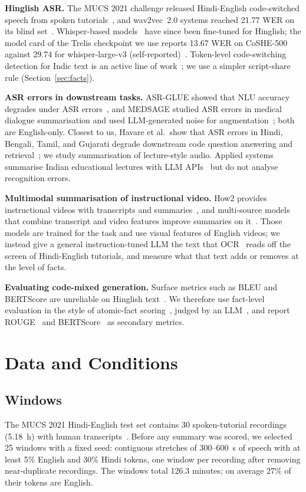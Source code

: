 \documentclass[conference]{IEEEtran}
\begin{document}
\textbf{Hinglish ASR.} The MUCS 2021 challenge released Hindi-English code-switched speech from spoken tutorials~\cite{diwan2021mucs}, and wav2vec~2.0 systems reached 21.77 WER on its blind set~\cite{chadha2022}. Whisper-based models~\cite{radford2023whisper} have since been fine-tuned for Hinglish; the model card of the Trelis checkpoint we use reports 13.67 WER on CoSHE-500 against 29.74 for whisper-large-v3 (self-reported)~\cite{trelis2025}. Token-level code-switching detection for Indic text is an active line of work~\cite{bhanushali2026csdi}; we use a simpler script-share rule (Section~\ref{sec:facts}).

\textbf{ASR errors in downstream tasks.} ASR-GLUE showed that NLU accuracy degrades under ASR errors~\cite{feng2021asrglue}, and MEDSAGE studied ASR errors in medical dialogue summarisation and used LLM-generated noise for augmentation~\cite{binici2025medsage}; both are English-only. Closest to us, Havare et al.\ show that ASR errors in Hindi, Bengali, Tamil, and Gujarati degrade downstream code question answering and retrieval~\cite{havare2026lost}; we study summarisation of lecture-style audio. Applied systems summarise Indian educational lectures with LLM APIs~\cite{kumar2026ccic} but do not analyse recognition errors.

\textbf{Multimodal summarisation of instructional video.} How2 provides instructional videos with transcripts and summaries~\cite{sanabria2018how2}, and multi-source models that combine transcript and video features improve summaries on it~\cite{palaskar2019how2sum}. Those models are trained for the task and use visual features of English videos; we instead give a general instruction-tuned LLM the text that OCR~\cite{smith2007tesseract} reads off the screen of Hindi-English tutorials, and measure what that text adds or removes at the level of facts.

\textbf{Evaluating code-mixed generation.} Surface metrics such as BLEU and BERTScore are unreliable on Hinglish text~\cite{srivastava2021hinge}. We therefore use fact-level evaluation in the style of atomic-fact scoring~\cite{min2023factscore}, judged by an LLM~\cite{zheng2023judge}, and report ROUGE~\cite{lin2004rouge} and BERTScore~\cite{zhang2020bertscore} as secondary metrics.

\section{Data and Conditions}
\subsection{Windows}
The MUCS 2021 Hindi-English test set contains 30 spoken-tutorial recordings (5.18~h) with human transcripts~\cite{diwan2021mucs}. Before any summary was scored, we selected 25 windows with a fixed seed: contiguous stretches of 300--600~s of speech with at least 5\% English and 30\% Hindi tokens, one window per recording after removing near-duplicate recordings. The windows total 126.3 minutes; on average 27\% of their tokens are English.
\end{document}
